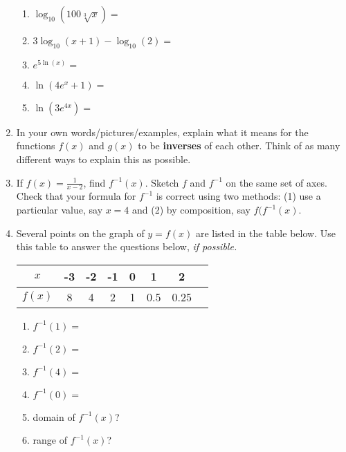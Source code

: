 \documentclass[11pt,fleqn]{article}
\begin{document}
\begin{enumerate}
\begin{multicols}{2}
\begin{enumerate}
		 \item $\log_{10}(100\sqrt[3]{x})=$\\
		\item $3\log_{10}(x+1)-\log_{10}(2)=$\\
		\item $e^{5\ln(x)}=$\\
		\item $\ln(4e^x+1)=$\\
		\item $\ln(3e^{4x})=$\\
		 \end{enumerate}
	\end{multicols}
\noindent {}
 \item In your own words/pictures/examples, explain what it means for the functions $f(x)$ and $g(x)$ to be \textbf{inverses} of each other. Think of as many different ways to explain this as possible.\\
 \vfill
 \newpage
 \item If $f(x)=\frac{1}{x-2}$, find $f^{-1}(x).$ Sketch $f$ and $f^{-1}$ on the same set of axes. Check that your formula for $f^{-1}$ is correct using two methods: (1) use a particular value, say $x=4$ and (2) by composition, say $f(f^{-1}(x).$
 \vfill
 	\item Several points on the graph of $y=f(x)$ are listed in the table below. Use this table to answer the questions below, \emph{if possible.}
\begin{multicols}{2} 
 \begin{tabular}{c || c| c|c|c|c|c|c}
 $x$ &-3& -2&-1&0&1&2\\
 \hline
 $f(x)$ &8& 4&2&1&0.5&0.25 \\
 \end{tabular}
 \begin{enumerate}
 \item $f^{-1}(1)=$\\
  \item $f^{-1}(2)=$\\
   \item $f^{-1}(4)=$\\
    \item $f^{-1}(0)=$\\
     \item domain of $f^{-1}(x)$?\\
      \item range of $f^{-1}(x)$?\\
  \end{enumerate}
 \end{multicols} 

\end{enumerate}
\end{document}
